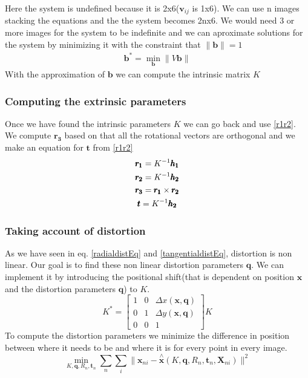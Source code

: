 Here the system is undefined because it is 2x6($\pmb{v}_{ij}$ is 1x6).  We can use n images stacking the equations and the the system becomes 2nx6. We would need 3 or more images for the system to be indefinite and we can aproximate solutions for the system by minimizing it with the constraint that $\|\pmb{b}\|=1$
\begin{gather}
    \pmb{b}^*=\min_{\pmb{b}}\|V\pmb{b}\|
    \label{bmin}
\end{gather}
With the approximation of $\pmb{b}$ we can compute the intrinsic matrix $K$

\subsubsection{Computing the extrinsic parameters}
Once we have found the intrinsic parameters $K$ we can go back and use \ref{r1r2}. We compute $\pmb{r_3}$ based on that all the rotational vectors are orthogonal and we make an equation for $\pmb{t}$ from \ref{r1r2}
\begin{gather}
    \pmb{r_1}=K^{-1}\pmb{h_1} \notag\\
    \pmb{r_2}=K^{-1}\pmb{h_2} \notag\\
    \pmb{r_3}=\pmb{r_1} \times\pmb{r_2} \notag\\
    \pmb{t}=K^{-1}\pmb{h_2} 
    \label{extrinsicequations}
\end{gather}

\subsubsection{Taking account of distortion}

As we have seen in eq. \ref{radialdistEq} and \ref{tangentialdistEq}, distortion is non linear. Our goal is to find these non linear distortion parameters $\pmb{q}$. We can implement it by introducing the positional shift(that is dependent on position $\pmb{x}$ and the distortion parameters $\pmb{q}$) to $K$. 
\[
    K^*=\begin{bmatrix}
        1   &   0   &   \Delta x(\pmb{x, q}) \\
        0   &   1   &   \Delta y(\pmb{x, q}) \\
        0   &   0   &   1
    \end{bmatrix}
    K
\]
To compute the distortion parameters we minimize the difference in position between where it needs to be and where it is for every point in every image.
\begin{equation}
    \min_{K, \pmb{q}, R_n, \pmb{t}_n}
    \sum_n  \sum_i
    \|
        \pmb{x}_{ni} - \overset{\wedge}{\pmb{x}}(K, \pmb{q}, R_n, \pmb{t}_n, \pmb{X}_{ni})
    \|^2
    \label{distMinEq}
\end{equation}

